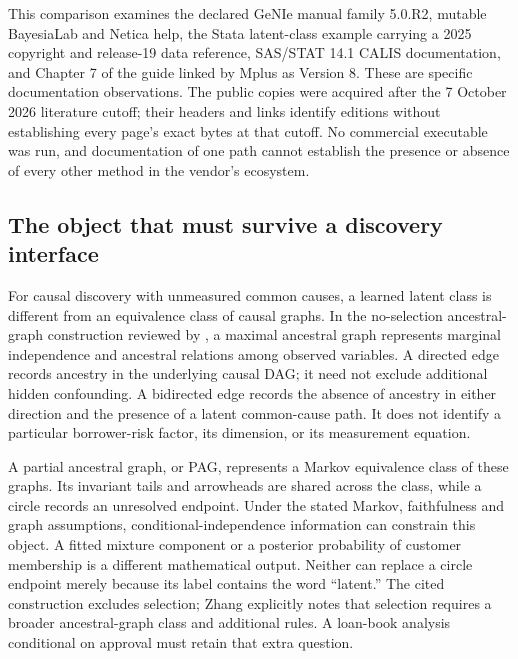 This comparison examines the declared GeNIe manual family 5.0.R2,
mutable BayesiaLab and Netica help, the Stata latent-class example
carrying a 2025 copyright and release-19 data reference, SAS/STAT 14.1
CALIS documentation, and Chapter 7 of the guide linked by Mplus as
Version 8. These are specific documentation observations. The public
copies were acquired after the 7 October 2026 literature cutoff; their
headers and links identify editions without establishing every page's
exact bytes at that cutoff. No commercial executable was run, and
documentation of one path cannot establish the presence or absence of
every other method in the vendor's ecosystem.
\citep{exec13_genie_readme,exec13_latent_genie_parameters,
exec13_latent_bayesia_data,exec13_latent_netica_structure,
exec13_latent_stata_lca,exec13_latent_sas_calis,exec13_latent_mplus}

\hypertarget{the-object-that-must-survive-a-discovery-interface}{%
\subsection{The object that must survive a discovery
interface}\label{the-object-that-must-survive-a-discovery-interface}}

For causal discovery with unmeasured common causes, a learned latent
class is different from an equivalence class of causal graphs. In the
no-selection ancestral-graph construction reviewed by
\citet[Section 3]{zhang2008}, a maximal ancestral graph represents
marginal independence and ancestral relations among observed variables.
A directed edge records ancestry in the underlying causal DAG; it need
not exclude additional hidden confounding. A bidirected edge records the
absence of ancestry in either direction and the presence of a latent
common-cause path. It does not identify a particular borrower-risk
factor, its dimension, or its measurement equation.

A partial ancestral graph, or PAG, represents a Markov equivalence class
of these graphs. Its invariant tails and arrowheads are shared across
the class, while a circle records an unresolved endpoint. Under the
stated Markov, faithfulness and graph assumptions,
conditional-independence information can constrain this object. A fitted
mixture component or a posterior probability of customer membership is a
different mathematical output. Neither can replace a circle endpoint
merely because its label contains the word ``latent.'' The cited
construction excludes selection; Zhang explicitly notes that selection
requires a broader ancestral-graph class and additional rules. A
loan-book analysis conditional on approval must retain that extra
question. \citep[pp.1442--1445]{zhang2008}

